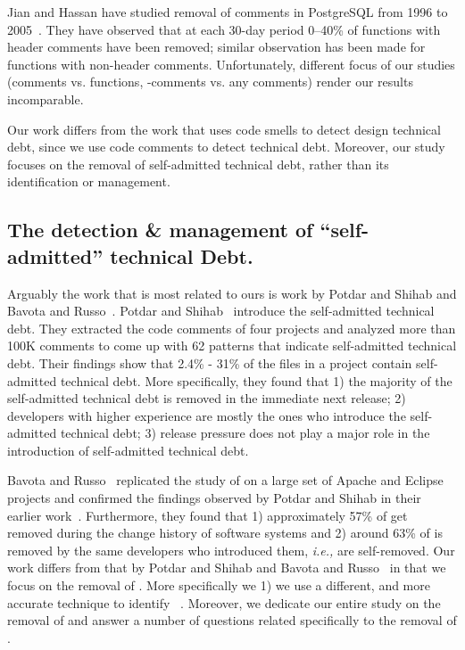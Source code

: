 Jian and Hassan have studied removal of comments in PostgreSQL from 1996 to 2005~\cite{Jiang:Hassan}. They have observed that at each 30-day period 0--40\% of functions with header comments have been removed; similar observation has been made for functions with non-header comments. Unfortunately, different focus of our studies (comments vs. functions, \SATD-comments vs. any comments) render our results incomparable.


Our work differs from the work that uses code smells to detect design technical debt, since we use code comments to detect technical debt. Moreover, our study focuses on the removal of self-admitted technical debt, rather than its identification or management.




\subsection{The detection \& management of ``self-admitted'' technical Debt.} 

Arguably the work that is most related to ours is work by Potdar and Shihab\cite{Potdar2014ICSME} and Bavota and Russo~\cite{Bavota2016MSR}. Potdar and Shihab~\cite{Potdar2014ICSME} introduce the self-admitted technical debt. They extracted the code comments of four projects and analyzed more than 100K comments to come up with 62  patterns that indicate self-admitted technical debt. Their findings show that 2.4\% - 31\% of the files in a project contain self-admitted technical debt. More specifically, they found that 1) the majority of the self-admitted technical debt is removed in the immediate next release; 2) developers with higher experience are mostly the ones who introduce the self-admitted technical debt; 3) release pressure does not play a major role in the introduction of self-admitted technical debt.

Bavota and Russo~\cite{Bavota2016MSR} replicated the study of \SATD on a large set of Apache and Eclipse projects and confirmed the findings observed by Potdar and Shihab in their earlier work~\cite{Potdar2014ICSME}. Furthermore, they found that 1) approximately 57\% of \SATD get removed during the change history of software systems and 2) around 63\% of \SATD is removed by the same developers who introduced them, \emph{i.e.,} are self-removed. Our work differs from that by Potdar and Shihab\cite{Potdar2014ICSME} and Bavota and Russo~\cite{Bavota2016MSR} in that we focus on the removal of \SATD. More specifically we 1) we use a different, and more accurate technique to identify \SATD~\cite{Maldonado2015TSE}. Moreover, we dedicate our entire study on the removal of \SATD and answer a number of questions related specifically to the removal of \SATD.

